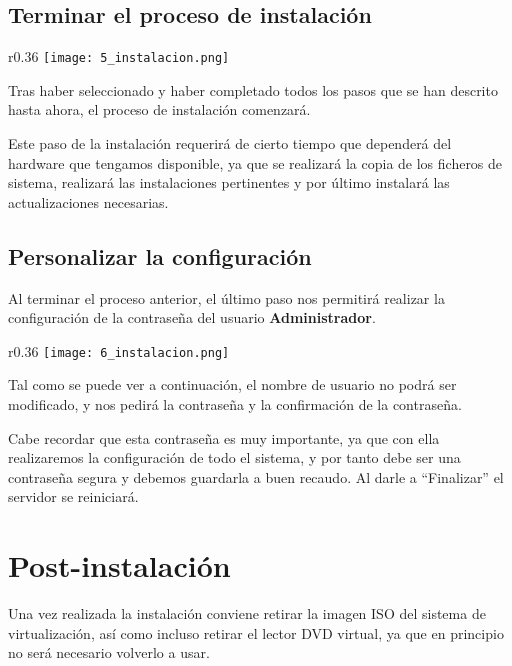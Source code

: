 \subsection{Terminar el proceso de instalación}

\begin{wrapfigure}{r}{0.36\linewidth}
    \centering
    \vspace{-20pt}
    \texttt{[image: 5\_instalacion.png]}
\end{wrapfigure}
Tras haber seleccionado y haber completado todos los pasos que se han descrito hasta ahora, el proceso de instalación comenzará.

Este paso de la instalación requerirá de cierto tiempo que dependerá del hardware que tengamos disponible, ya que se realizará la copia de los ficheros de sistema, realizará las instalaciones pertinentes y por último instalará las actualizaciones necesarias.

\vspace{3em}

\subsection{Personalizar la configuración}
Al terminar el proceso anterior, el último paso nos permitirá realizar la configuración de la contraseña del usuario \textbf{Administrador}.



\begin{wrapfigure}{r}{0.36\linewidth}
    \centering
    \vspace{-60pt}
    \texttt{[image: 6\_instalacion.png]}
    \vspace{-40pt}
\end{wrapfigure}Tal como se puede ver a continuación, el nombre de usuario no podrá ser modificado, y nos pedirá la contraseña y la confirmación de la contraseña.


Cabe recordar que esta contraseña es muy importante, ya que con ella realizaremos la configuración de todo el sistema, y por tanto debe ser una contraseña segura y debemos guardarla a buen recaudo. Al darle a “Finalizar” el servidor se reiniciará.

\section{Post-instalación}

Una vez realizada la instalación conviene retirar la imagen ISO del sistema de virtualización, así como incluso retirar el lector DVD virtual, ya que en principio no será necesario volverlo a usar.

